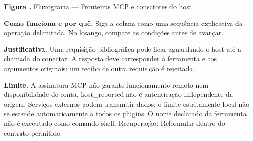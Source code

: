 {\small\textbf{Figura \thefigure.} Fluxograma --- Fronteiras MCP e conectores do host}\par\smallskip
\noindent\textbf{Como funciona e por quê.} Siga a coluna como uma sequência explicativa da operação delimitada. No losango, compare as condições antes de avançar.\par
\noindent\textbf{Justificativa.} Uma requisição bibliográfica pode ficar aguardando o host até a chamada do conector. A resposta deve corresponder à ferramenta e aos argumentos originais; um recibo de outra requisição é rejeitado.\par
\noindent\textbf{Limite.} A assinatura MCP não garante funcionamento remoto nem disponibilidade de conta. host\_reported não é autenticação independente da origem. Serviços externos podem transmitir dados: o limite estritamente local não se estende automaticamente a todos os plugins. O nome declarado da ferramenta não é executado como comando shell. Recuperação: Reformular dentro do contrato permitido\par\smallskip
{}
